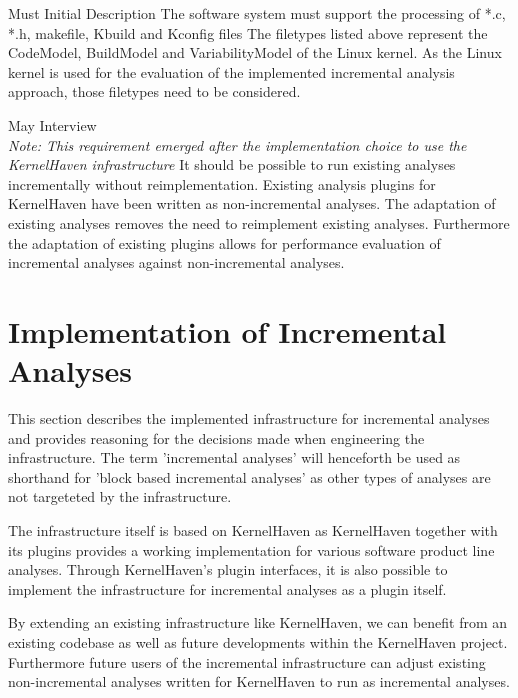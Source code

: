 \documentclass[a4paper]{article}
\begin{document}
\clearpage
\begin{req} 
\reqtable
    {Must}  {Initial Description}
	{The software system must support the processing of *.c, *.h, makefile, Kbuild and Kconfig files}
	{The filetypes listed above represent the CodeModel, BuildModel and VariabilityModel of the Linux kernel. As the Linux kernel is used for the evaluation of the implemented incremental analysis approach, those filetypes need to be considered.}
\end{req}





\begin{req} 
\reqtable
    {May}  {Interview \\ \emph{Note: This requirement emerged after the implementation choice to use the KernelHaven infrastructure}}
	{It should be possible to run existing analyses incrementally without reimplementation.}
	{Existing analysis plugins for KernelHaven have been written as non-incremental analyses. The adaptation of existing analyses removes the need to reimplement existing analyses. Furthermore the adaptation of existing plugins allows for performance evaluation of incremental analyses against non-incremental analyses.}
\end{req}

\newpage

\section{Implementation of Incremental Analyses}

This section describes the implemented infrastructure for incremental analyses and provides reasoning for the decisions made when engineering the infrastructure. The term 'incremental analyses' will henceforth be used as shorthand for  'block based incremental analyses' as other types of analyses are not targeteted by the infrastructure.

The infrastructure itself is based on KernelHaven\cite{KernelHaven} as KernelHaven together with its plugins provides a working implementation for various software product line analyses. Through KernelHaven's plugin interfaces, it is also possible to implement the infrastructure for incremental analyses as a plugin itself.

By extending an existing infrastructure like KernelHaven, we can benefit from an existing codebase as well as future developments within the KernelHaven project. Furthermore future users of the incremental infrastructure can adjust existing non-incremental analyses written for KernelHaven to run as incremental analyses.
\end{document}
